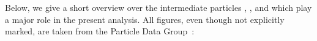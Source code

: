 Below, we give a short overview over the intermediate particles \Lb, \Xibz, \Lz and \Dz which play a major role in the present analysis.
All figures, even though not explicitly marked, are taken from the Particle Data Group~\cite{pdg}:
